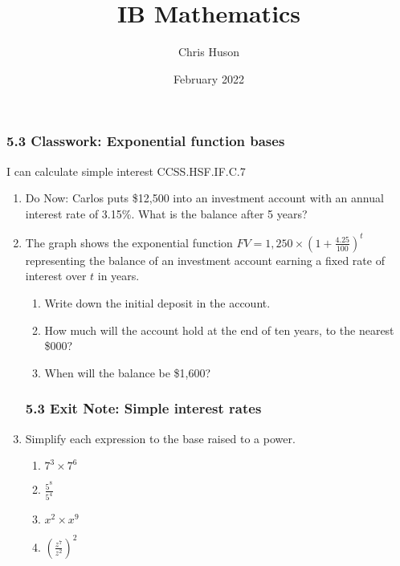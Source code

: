 \documentclass[12pt, twoside]{article}
\title{IB Mathematics}
\author{Chris Huson}
\date{February 2022}
\begin{document}
\subsubsection*{5.3 Classwork: Exponential function bases}
I can calculate simple interest \hfill CCSS.HSF.IF.C.7

\begin{enumerate}
\item Do Now: Carlos puts \$12,500 into an investment account with an annual interest rate of 3.15\%. What is the balance after 5 years? \vspace{2cm}

\item The graph shows the exponential function $\displaystyle FV=1,250 \times \left( 1+\frac{4.25}{100} \right)^t$ representing the balance of an investment account earning a fixed rate of interest over $t$ in years.
\begin{multicols}{2}
    \begin{enumerate}[itemsep=1cm]
        \item Write down the initial deposit in the account.
        \item How much will the account hold at the end of ten years, to the nearest \$000?
        \item When will the balance be \$1,600?
    \end{enumerate}
    \begin{center}
    \end{center}
    \end{multicols}

\newpage
\subsubsection*{5.3 Exit Note: Simple interest rates}
\item Simplify each expression to the base raised to a power.
    \begin{multicols}{2}
    \begin{enumerate}[itemsep=0.5cm]
        \item $7^3 \times 7^6$
        \item $\displaystyle \frac{5^8}{5^4}$
        \item $x^2 \times x^9$
        \item $\displaystyle \left( \frac{z^7}{z^2}\right)^{2}$
    \end{enumerate}
    \end{multicols}


\end{enumerate}
\end{document}
